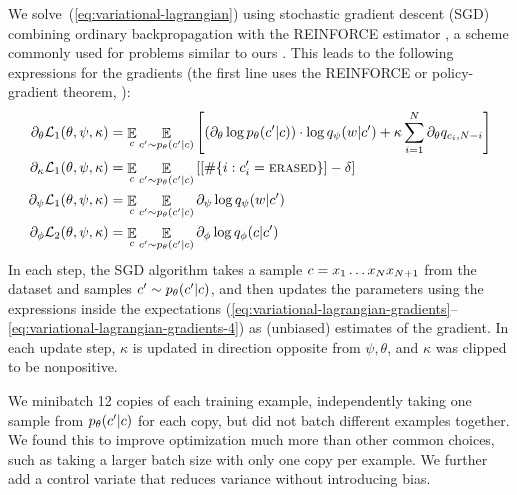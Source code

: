 We solve~(\ref{eq:variational-lagrangian}) using stochastic gradient descent (SGD) combining ordinary backpropagation with the REINFORCE estimator \citep{Williams1992SimpleSG}, a scheme commonly used for problems similar to ours \citep{lei2016rationalizing,hahn_modeling_2016,miao2016language, seo2017neural, yu2017learning, hansen2019neural, lee2019learning}.
This leads to the following expressions for the gradients (the first line uses the REINFORCE or policy-gradient theorem, \citep{Williams1992SimpleSG}):
\begin{align}\label{eq:variational-lagrangian-gradients}
	\partial_\theta \mathcal{L}_1(\theta, \psi, \kappa) &= \mathop{\mathbb{E}}_c \mathop{\mathbb{E}}_{c' \sim p_\theta(c'|c)} \left[ \left( \partial_\theta \log p_\theta(c'|c) \right) \cdot \log q_\psi(w|c') + \kappa \sum_{i=1}^N \partial_\theta q_{c_i, N-i} \right]\\
	\partial_\kappa \mathcal{L}_1(\theta, \psi, \kappa) &=\mathop{\mathbb{E}}_c \mathop{\mathbb{E}}_{c' \sim p_\theta(c'|c)}\left[\left[{\#\{i : c'_i=\text{\textsc{erased}}\}}\right] - \delta\right] \\
	\partial_\psi \mathcal{L}_1(\theta, \psi, \kappa) &=\mathop{\mathbb{E}}_c \mathop{\mathbb{E}}_{c' \sim p_\theta(c'|c)} \partial_\psi \log q_\psi(w|c')
	\\
	\partial_\phi \mathcal{L}_2(\theta, \psi, \kappa) &=\mathop{\mathbb{E}}_c \mathop{\mathbb{E}}_{c' \sim p_\theta(c'|c)} \partial_\phi \log q_{\phi}(c|c') \label{eq:variational-lagrangian-gradients-4}
\end{align}
In each step, the SGD algorithm takes a sample $c=x_1\dots x_N x_{N+1}$ from the dataset and samples $c' \sim p_\theta(c'|c)$, and then updates the parameters using the expressions inside the expectations (\ref{eq:variational-lagrangian-gradients}--\ref{eq:variational-lagrangian-gradients-4}) as (unbiased) estimates of the gradient.
In each update step, $\kappa$ is updated in direction opposite from $\psi, \theta$, and $\kappa$ was clipped to be nonpositive.

We minibatch 12 copies of each training example, independently taking one sample from $p_\theta(c'|c)$ for each copy, but did not batch different examples together. We found this to improve optimization much more than other common choices, such as taking a larger batch size with only one copy per example.
We further add a control variate \citep{Williams1992SimpleSG} that reduces variance without introducing bias.

